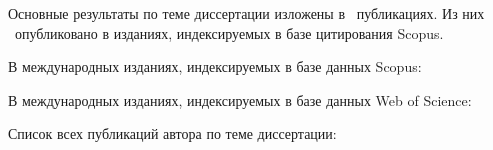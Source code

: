 Основные результаты по теме диссертации изложены в \theAllMyPapers~публикациях. 
Из них
\theScopusPapers~опубликовано в изданиях, индексируемых в базе цитирования Scopus. 

В международных изданиях, индексируемых в базе данных Scopus:
\begin{refsection}
\nocite{*}
\printbibliography[
    keyword=scopus,
    heading=none,
    resetnumbers=true
]
\end{refsection}



В международных изданиях, индексируемых в базе данных Web of Science:
\begin{refsection}
\nocite{*}
\printbibliography[
    keyword=wos,
    heading=none,
    resetnumbers=true
]
\end{refsection}
Список всех публикаций автора по теме диссертации:
\begin{refsection}
\nocite{*}
\printbibliography[
    keyword=own,
    heading=none,
    resetnumbers=true
]
\end{refsection}
